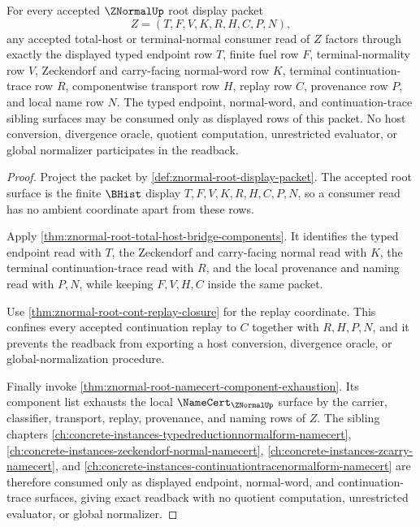 \begin{theorem}\label{thm:znormal-root-display-packet-bridge-readback-exactness}
For every accepted $\ZNormalUp$ root display packet
$$
Z=(T,F,V,K,R,H,C,P,N),
$$
any accepted total-host or terminal-normal consumer read of $Z$ factors through exactly the displayed typed endpoint row $T$, finite fuel row $F$, terminal-normality row $V$, Zeckendorf and carry-facing normal-word row $K$, terminal continuation-trace row $R$, componentwise transport row $H$, replay row $C$, provenance row $P$, and local name row $N$. The typed endpoint, normal-word, and continuation-trace sibling surfaces may be consumed only as displayed rows of this packet. No host conversion, divergence oracle, quotient computation, unrestricted evaluator, or global normalizer participates in the readback.
\end{theorem}
\begin{proof}
Project the packet by \autoref{def:znormal-root-display-packet}. The accepted root surface is the finite $\BHist$ display $T,F,V,K,R,H,C,P,N$, so a consumer read has no ambient coordinate apart from these rows.

Apply \autoref{thm:znormal-root-total-host-bridge-components}. It identifies the typed endpoint read with $T$, the Zeckendorf and carry-facing normal read with $K$, the terminal continuation-trace read with $R$, and the local provenance and naming read with $P,N$, while keeping $F,V,H,C$ inside the same packet.

Use \autoref{thm:znormal-root-cont-replay-closure} for the replay coordinate. This confines every accepted continuation replay to $C$ together with $R,H,P,N$, and it prevents the readback from exporting a host conversion, divergence oracle, or global-normalization procedure.

Finally invoke \autoref{thm:znormal-root-namecert-component-exhaustion}. Its component list exhausts the local $\NameCert_{\ZNormalUp}$ surface by the carrier, classifier, transport, replay, provenance, and naming rows of $Z$. The sibling chapters \autoref{ch:concrete-instances-typedreductionnormalform-namecert}, \autoref{ch:concrete-instances-zeckendorf-normal-namecert}, \autoref{ch:concrete-instances-zcarry-namecert}, and \autoref{ch:concrete-instances-continuationtracenormalform-namecert} are therefore consumed only as displayed endpoint, normal-word, and continuation-trace surfaces, giving exact readback with no quotient computation, unrestricted evaluator, or global normalizer.
\end{proof}
